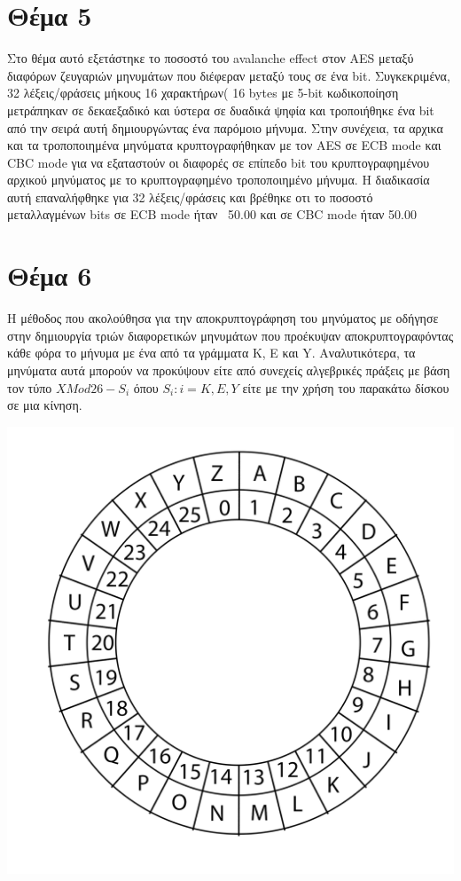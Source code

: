 \documentclass[a4paper, 11pt]{article}
\newcommand{\lt}{\latintext}
\begin{document}
\newpage


\section*{Θέμα 5}
Στο θέμα αυτό εξετάστηκε το ποσοστό του {\lt avalanche effect} στον {\lt AES} μεταξύ διαφόρων ζευγαριών μηνυμάτων που διέφεραν μεταξύ τους σε ένα {\lt bit}. Συγκεκριμένα, 32 λέξεις/φράσεις μήκους 16 χαρακτήρων( 16 {\lt bytes} με 5-{\lt bit} κωδικοποίηση μετράπηκαν σε δεκαεξαδικό και ύστερα σε δυαδικά ψηφία και τροποιήθηκε ένα {\lt bit} από την σειρά αυτή δημιουργώντας ένα παρόμοιο μήνυμα. Στην συνέχεια, τα αρχικα και τα τροποποιημένα μηνύματα κρυπτογραφήθηκαν με τον {\lt AES} σε {\lt ECB mode} και {\lt CBC mode} για να εξαταστούν οι διαφορές σε επίπεδο {\lt bit} του κρυπτογραφημένου αρχικού μηνύματος με το κρυπτογραφημένο τροποποιημένο μήνυμα. Η διαδικασία αυτή επαναλήφθηκε για 32 λέξεις/φράσεις και βρέθηκε οτι το ποσοστό μεταλλαγμένων bits σε {\lt ECB mode} ήταν ~50.00 και σε {\lt CBC mode} ήταν 50.00%




\newpage
\section*{Θέμα 6}

Η μέθοδος που ακολούθησα για την αποκρυπτογράφηση του μηνύματος με οδήγησε στην δημιουργία τριών διαφορετικών μηνυμάτων που προέκυψαν αποκρυπτογραφόντας κάθε φόρα το μήνυμα με ένα από τα γράμματα {\lt K}, {\lt E} και {\lt Y}. Αναλυτικότερα, τα μηνύματα αυτά μπορούν να προκύψουν είτε από συνεχείς αλγεβρικές πράξεις με βάση τον τύπο $ X  Μod 26 - S_{i} $ όπου $S_{i} : i = {K, E, Y} $ είτε με την χρήση του παρακάτω δίσκου σε μια κίνηση.

\centerline{\includegraphics[scale=0.5]{disk.png}}
\end{document}
